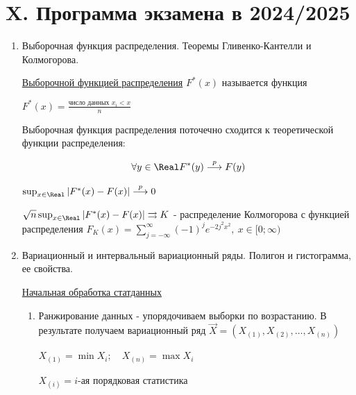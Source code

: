 \clearpage

\section{X. Программа экзамена в 2024/2025}


\begin{enumerate}
    \item Выборочная функция распределения. Теоремы Гливенко-Кантелли и Колмогорова.

    \Def \hyperlink{selective_distribution_function}{Выборочной функцией распределения} $F^*(x)$ называется функция 
    
    $F^*(x) = \frac{\text{число данных } x_i < x}{n}$

    \begin{MyTheorem}
        \Ths Выборочная функция распределения поточечно сходится к теоретической функции распределения:

        \[\forall y \in \Real F^*(y) \overset{p}{\longrightarrow} F(y)\]
    \end{MyTheorem}

    \begin{MyTheorem}
         $\sup_{x \in \Real} |F^*(x) - F(x)| \overset{p}{\longrightarrow} 0$
    \end{MyTheorem}

    \begin{MyTheorem}
         $\sqrt{n} \sup_{x \in \Real} |F^*(x) - F(x)| \rightrightarrows K$ - распределение Колмогорова с 
        функцией распределения $F_K(x) = \sum_{j = -\infty}^{\infty} (-1)^j e^{-2 j^2 x^2}, \ x \in [0;\infty)$
    \end{MyTheorem}

    \item Вариационный и интервальный вариационный ряды. Полигон и гистограмма, ее свойства.

        
    \hyperlink{initial_data_processing}{Начальная обработка статданных}

    \begin{enumerate}
        \item Ранжирование данных - упорядочиваем выборки по возрастанию. В результате получаем вариационный ряд $\vec{X} = (X_{(1)}, X_{(2)}, \dots, X_{(n)})$

        $X_{(1)} = \min X_i; \quad X_{(n)} = \max X_i$

        $X_{(i)} = i$-ая порядковая статистика


\end{enumerate}
\end{enumerate}
